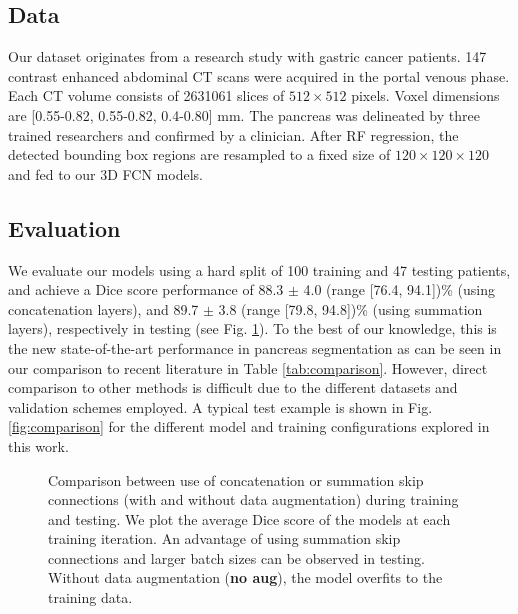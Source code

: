 \documentclass[a4paper]{spie}  %
\begin{document}
\subsection{Data}
Our dataset originates from a research study with gastric cancer patients. 147 contrast enhanced abdominal CT scans were acquired in the portal venous phase. Each CT volume consists of 2631061 slices of $512\times512$ pixels. Voxel dimensions are [0.55-0.82, 0.55-0.82, 0.4-0.80] mm. The pancreas was delineated by three trained researchers and confirmed by a clinician. After RF regression, the detected bounding box regions are resampled to a fixed size of $120\times120\times120$ and fed to our 3D FCN models.
\subsection{Evaluation}
We evaluate our models using a hard split of 100 training and 47 testing patients, and achieve a Dice score performance of 88.3 $\pm$ 4.0 (range [76.4, 94.1])\% (using concatenation layers), and 89.7 $\pm$ 3.8 (range [79.8, 94.8])\% (using summation layers), respectively in testing (see Fig. \ref{fig:training}). To the best of our knowledge, this is the new state-of-the-art performance in pancreas segmentation as can be seen in our comparison to recent literature in Table \ref{tab:comparison}. However, direct comparison to other methods is difficult due to the different datasets and validation schemes employed. A typical test example is shown in Fig. \ref{fig:comparison} for the different model and training configurations explored in this work.
\begin{figure}[tb]
	\centering
	\caption{Comparison between use of concatenation or summation skip connections (with and without data augmentation) during training and testing. We plot the average Dice score of the models at each training iteration. An advantage of using summation skip connections and larger batch sizes can be observed in testing. Without data augmentation (\textbf{no aug}), the model overfits to the training data. \label{fig:training}}
\end{figure}
\end{document}

